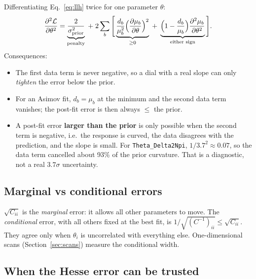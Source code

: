 \documentclass[11pt]{article}
\newcommand{\code}[1]{\texttt{#1}}
\begin{document}
Differentiating Eq.~\eqref{eq:llh} twice for one parameter $\theta$:
\begin{equation}
  \frac{\partial^2\mathcal{L}}{\partial\theta^2}
  = \underbrace{\frac{2}{\sigma_{\rm prior}^2}}_{\text{penalty}}
  \;+\; 2\sum_b \Bigg[
      \underbrace{\frac{d_b}{\mu_b^2}\Big(\frac{\partial\mu_b}{\partial\theta}\Big)^2}_{\ge 0}
      \;+\;
      \underbrace{\Big(1-\frac{d_b}{\mu_b}\Big)\frac{\partial^2\mu_b}{\partial\theta^2}}_{\text{either sign}}
  \Bigg].
  \label{eq:hess}
\end{equation}
Consequences:
\begin{itemize}
  \item The first data term is never negative, so a dial with a real slope can
    only \emph{tighten} the error below the prior.
  \item For an Asimov fit, $d_b=\mu_b$ at the minimum and the second data term
    vanishes; the post-fit error is then always $\le$ the prior.
  \item A post-fit error \textbf{larger than the prior} is only possible when the
    second term is negative, i.e.\ the response is curved, the data disagrees
    with the prediction, and the slope is small. For \code{Theta\_Delta2Npi},
    $1/3.7^2 \approx 0.07$, so the data term cancelled about 93\% of the prior
    curvature. That is a diagnostic, not a real $3.7\sigma$ uncertainty.
\end{itemize}

\subsection{Marginal vs conditional errors}

$\sqrt{C_{ii}}$ is the \emph{marginal} error: it allows all other parameters to
move. The \emph{conditional} error, with all others fixed at the best fit, is
$1/\sqrt{(C^{-1})_{ii}} \le \sqrt{C_{ii}}$. They agree only when $\theta_i$ is
uncorrelated with everything else. One-dimensional scans
(Section~\ref{sec:scans}) measure the conditional width.

\subsection{When the Hesse error can be trusted}
\label{sec:bounds}
\end{document}
